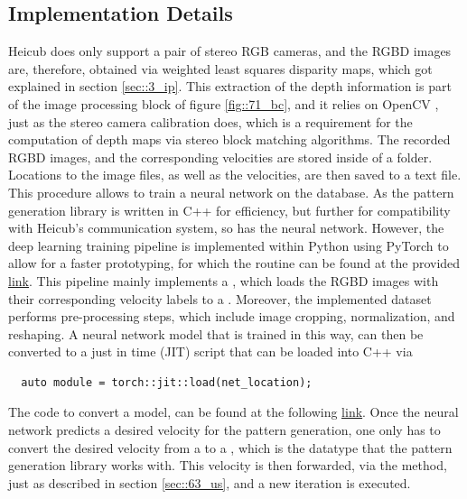 \subsection{Implementation Details}
\label{sec::712_id}
Heicub does only support a pair of stereo RGB cameras, and the RGBD images are, therefore, obtained via weighted least squares disparity maps, which got explained in section \ref{sec::3_ip}. This extraction of the depth information is part of the image processing block of figure \ref{fig::71_bc}, and it relies on OpenCV \cite{opencv_library}, just as the stereo camera calibration does, which is a requirement for the computation of depth maps via stereo block matching algorithms. The recorded RGBD images, and the corresponding velocities are stored inside of a folder. Locations to the image files, as well as the velocities, are then saved to a text file. This procedure allows to train a neural network on the database. As the pattern generation library is written in C++ for efficiency, but further for compatibility with Heicub's communication system, so has the neural network. However, the deep learning training pipeline is implemented within Python using PyTorch \cite{paszke2017automatic} to allow for a faster prototyping, for which the routine can be found at the provided \href{https://github.com/mhubii/nmpc_pattern_generator/blob/master/libs/learning/python/train_rgbd.py}{\underline{link}}. This pipeline mainly implements a , which loads the RGBD images with their corresponding velocity labels to a . Moreover, the implemented dataset performs pre-processing steps, which include image cropping, normalization, and reshaping. A neural network model that is trained in this way, can then be converted to a just in time (JIT) script that can be loaded into C++ via
\begin{verbatim}
  auto module = torch::jit::load(net_location);
\end{verbatim}
The code to convert a model, can be found at the following \href{https://github.com/mhubii/nmpc_pattern_generator/blob/master/libs/learning/python/python_to_cpp.py}{\underline{link}}. Once the neural network predicts a desired velocity for the pattern generation, one only has to convert the desired velocity from a  to a , which is the datatype that the pattern generation library works with. This velocity is then forwarded, via the  method, just as described in section \ref{sec::63_us}, and a new iteration is executed.